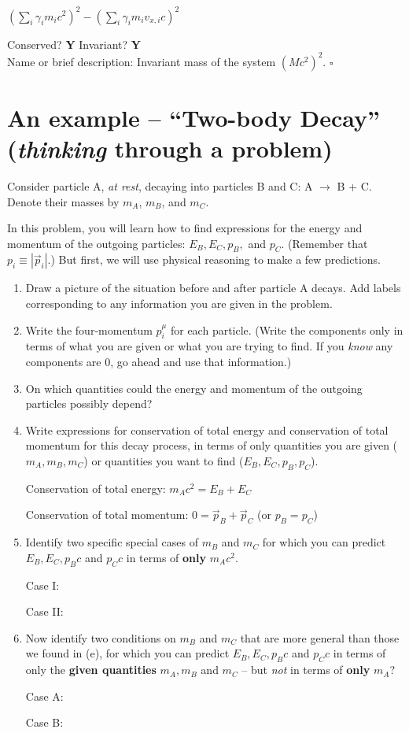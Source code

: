 \documentclass[11pt, letterpaper, openany]{book}
\newenvironment{exercise}[1][Exercise]{%
  \tcolorbox[blanker, breakable, left=1em,
    before skip=1em, after skip=1em,
    borderline west={3pt}{0pt}{PhysNavy},
    colback=PhysCream,
    before upper={\textcolor{PhysNavy}{\sffamily\bfseries #1:}\space}
  ]%
}{%
  \endtcolorbox%
}
\newenvironment{solution}[1][Solution]{%
  \tcolorbox[blanker, breakable, left=1em,
    before skip=1em, after skip=1em,
    borderline west={2pt}{0pt}{PhysTeal},
    colback=PhysCream,
    before upper={\textcolor{PhysTeal}{\sffamily\bfseries #1.}\space}
  ]%
}{%
  \hfill\textcolor{PhysTeal}{\ensuremath{\square}}\endtcolorbox%
}
\begin{document}
\begin{exercise}[Quantity 5]
$\left(\sum_i \gamma_i m_i c^2\right)^2 - \left(\sum_i \gamma_i m_i v_{x,i} c\right)^2$
\end{exercise}
\begin{solution}
Conserved? \textbf{Y} \quad Invariant? \textbf{Y} \\
Name or brief description: Invariant mass of the system $(Mc^2)^2$.
\end{solution}

\section{An example -- ``Two-body Decay'' (\textit{thinking} through a problem)}

Consider particle A, \textit{at rest}, decaying into particles B and C: A $\to$ B + C. Denote their masses by $m_A$, $m_B$, and $m_C$.

In this problem, you will learn how to find expressions for the energy and momentum of the outgoing particles: $E_B, E_C, p_B,$ and $p_C$. (Remember that $p_i \equiv |\vec{p}_i|$.) But first, we will use physical reasoning to make a few predictions.

\begin{enumerate}[label=(\alph*)]
    \item Draw a picture of the situation before and after particle A decays. Add labels corresponding to any information you are given in the problem.
    \item Write the four-momentum $p^\mu_i$ for each particle. (Write the components only in terms of what you are given or what you are trying to find. If you \textit{know} any components are 0, go ahead and use that information.)
    \item On which quantities could the energy and momentum of the outgoing particles possibly depend?
    \item Write expressions for conservation of total energy and conservation of total momentum for this decay process, in terms of only quantities you are given ($m_A, m_B, m_C$) or quantities you want to find ($E_B, E_C, p_B, p_C$).
    
    Conservation of total energy: $m_A c^2 = E_B + E_C$
    
    Conservation of total momentum: $0 = \vec{p}_B + \vec{p}_C$ (or $p_B = p_C$)
    \item Identify two specific special cases of $m_B$ and $m_C$ for which you can predict $E_B, E_C, p_Bc$ and $p_Cc$ in terms of \textbf{only} $m_Ac^2$.
    
    Case I:
    
    Case II:
    \item Now identify two conditions on $m_B$ and $m_C$ that are more general than those we found in (e), for which you can predict $E_B, E_C, p_Bc$ and $p_Cc$ in terms of only the \textbf{given quantities} $m_A, m_B$ and $m_C$ -- but \textit{not} in terms of \textbf{only} $m_A$?
    
    Case A:
    
    Case B:
\end{enumerate}
\end{document}
